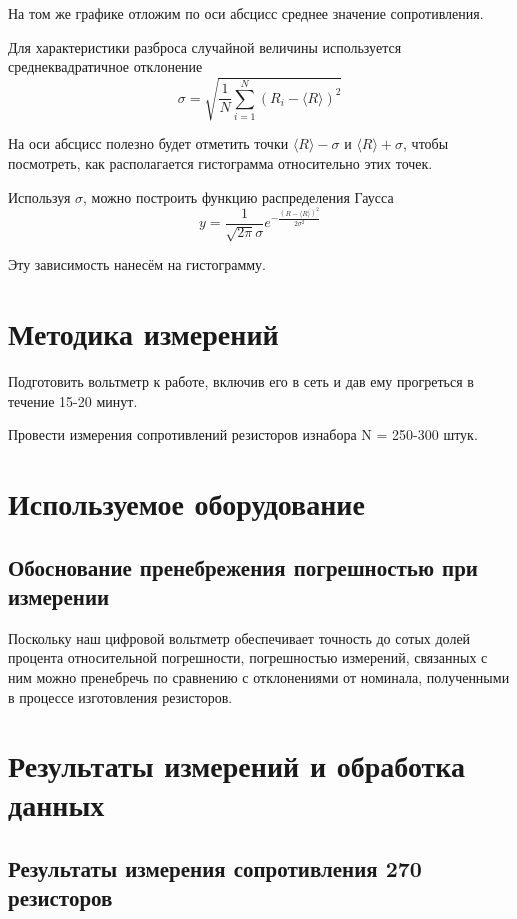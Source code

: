 \documentclass[a4paper, 12pt]{article}
\begin{document}
    На том же графике отложим по оси абсцисс среднее значение сопротивления.
    
    Для характеристики разброса случайной величины используется среднеквадратичное отклонение
    $$ \sigma = \sqrt{\frac{1}{N} \sum_{i = 1}^{N}(R_i - \langle R\rangle)^2}$$
    
    На оси абсцисс полезно будет отметить точки $\langle R\rangle-\sigma$ и $\langle R\rangle+\sigma$, чтобы посмотреть, как располагается гистограмма относительно этих точек.
    \par
    Используя $\sigma$, можно построить функцию распределения Гаусса
    $$y=\frac{1}{\sqrt{2\pi}\sigma}e^{-\frac{(R-\langle R\rangle)^2}{2\sigma^2}}$$
    
    Эту зависимость нанесём на гистограмму.

\section{Методика измерений}

Подготовить вольтметр к работе, включив его в сеть и дав ему прогреться в течение 15-20 минут.

Провести измерения сопротивлений резисторов изнабора N = 250-300 штук.



\section{Используемое оборудование}

\subsection*{Обоснование пренебрежения погрешностью при измерении}
    Поскольку наш цифровой вольтметр обеспечивает точность до сотых долей процента относительной погрешности, погрешностью измерений, связанных с ним можно пренебречь по сравнению с отклонениями от номинала, полученными в процессе изготовления резисторов.

\section{Результаты измерений и обработка данных}

\subsection*{Результаты измерения сопротивления 270 резисторов}
\end{document}
